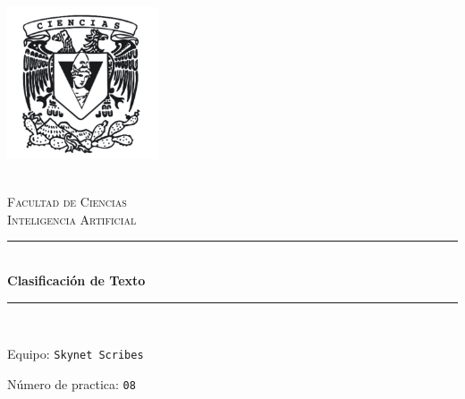 \begin{titlepage}
\center 
\newcommand{\HRule}{\rule{\linewidth}{0.5mm}} 

\includegraphics[width=4.5cm]{IMA/cienciasWhite.png}

\quad \\[0.2cm]
\textsc{\huge Facultad de Ciencias}\\[.6cm] 
\textsc{\huge Inteligencia Artificial}\\[0.5cm]

\makeatletter
    \HRule \\ [0.4cm]
        { \huge \bfseries Clasificación de Texto}\\
    \HRule \\ [0.4cm]
    
\vspace{2mm}

\begin{flushleft}
    \Large{Equipo:} \texttt{\Large Skynet Scribes}
\end{flushleft}
\begin{flushleft}
    \Large{Número de practica:} \texttt{\Large 08}\\[0.8cm]
\end{flushleft}


\begin{minipage}{0.8\textwidth}
    \begin{flushright}
            
    \end{flushright}
\end{minipage}    


\end{titlepage}
